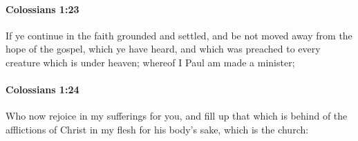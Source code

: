 		\paragraph{Colossians 1:23} %
			\label{COLOSSIANS-1-23}

			If ye continue in the faith grounded and settled, and be not moved away from the hope of the gospel, which ye have heard, and which was preached to every creature which is under heaven; whereof I Paul am made a minister;

			\begin{framed}
			\scriptsize
				\begin{compactdesc}
					\item[SBLG] 
				\end{compactdesc}
			\end{framed}

		\paragraph{Colossians 1:24} %
			\label{COLOSSIANS-1-24}

			Who now rejoice in my sufferings for you, and fill up that which is behind of the afflictions of Christ in my flesh for his body's sake, which is the church:

